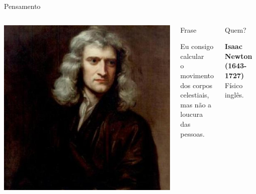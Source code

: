 \documentclass[xcolor=dvipsnames,table]{beamer}
\begin{document}
	\begin{frame}{Pensamento}
		\begin{columns}
		  		\begin{center}
		    		\includegraphics[height=.55\textheight]{images/newton}
		  		\end{center}
				\begin{block}{Frase}
					\begin{center}
						{\large Eu consigo calcular \\o movimento dos corpos celestiais, \\mas não a loucura das pessoas.}
					\end{center}
				\end{block}		  		
		  		\begin{block}{Quem?}
		  			\begin{center}
						{\bf Isaac Newton (1643-1727)} \\ Físico inglês.
					\end{center}
				\end{block}
		\end{columns}
	\end{frame}
	
\end{document}
